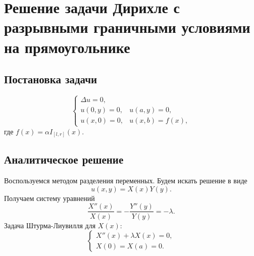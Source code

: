 \newpage
\chapter{Решение задачи Дирихле с разрывными граничными условиями на прямоугольнике}

\section{Постановка задачи}
\begin{equation}
	\begin{cases}
		\Delta u = 0, \\
		u(0, y) = 0,&u(a, y)=0,\\
		u(x, 0) = 0,&u(x, b)=f(x),
	\end{cases}
\end{equation}
где $f(x) = \alpha I_{[l,r]}(x)$.

\section{Аналитическое решение}
Воспользуемся методом разделения переменных. Будем искать решение в виде
\begin{equation*}
	u(x,y) = X(x)Y(y).
\end{equation*}
Получаем систему уравнений
\begin{equation}
	\frac{X''(x)}{X(x)}=-\frac{Y''(y)}{Y(y)}=-\lambda.
\end{equation}
Задача Штурма-Лиувилля для $X(x)$:
\begin{equation}\label{sl1}
	\begin{cases}
		X''(x)+\lambda X(x)=0,\\
		X(0)=X(a)=0.
	\end{cases}
\end{equation}


